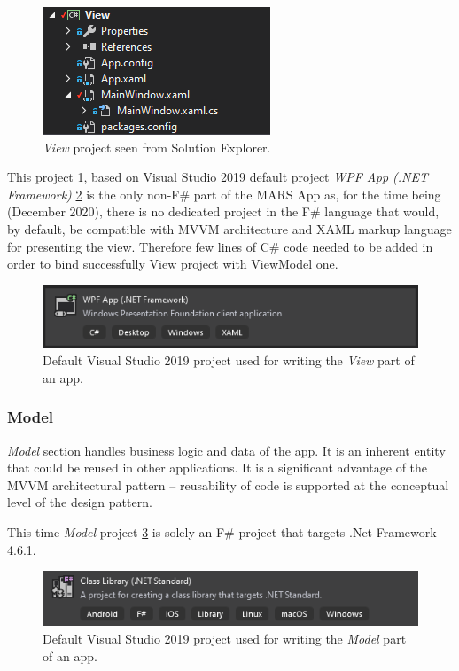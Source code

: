         \begin{figure}[H]
            \centering
            \includegraphics{img/view.png}
            \caption{\textit{View} project seen from Solution Explorer.}
            \label{fig:view}
        \end{figure}
        
        This project \ref{fig:view}, based on Visual Studio 2019 default project \textit{WPF App (.NET Framework)} \ref{fig:view_wpfApp} is the only non-F\# part of the MARS App as, for the time being (December 2020), there is no dedicated project in the F\# language that would, by default, be compatible with MVVM architecture and XAML markup language for presenting the view. Therefore few lines of C\# code needed to be added in order to bind successfully View project with ViewModel one.
        
        \begin{figure}
            \centering
            \includegraphics{img/view_wpfApp.png}
            \caption{Default Visual Studio 2019 project used for writing the \textit{View} part of an app.}
            \label{fig:view_wpfApp}
        \end{figure}

    \subsubsection{Model}
        \textit{Model} section handles business logic and data of the app. It is an inherent entity that could be reused in other applications. It is a significant advantage of the MVVM architectural pattern -- reusability of code is supported at the conceptual level of the design pattern.
        
        This time \textit{Model} project \ref{fig:model_VS19Project} is solely an F\# project that targets .Net Framework 4.6.1.
        \begin{figure}[H]
            \centering
            \includegraphics{img/model_VS19Project.png}
            \caption{Default Visual Studio 2019 project used for writing the \textit{Model} part of an app.}
            \label{fig:model_VS19Project}
        \end{figure}
        
